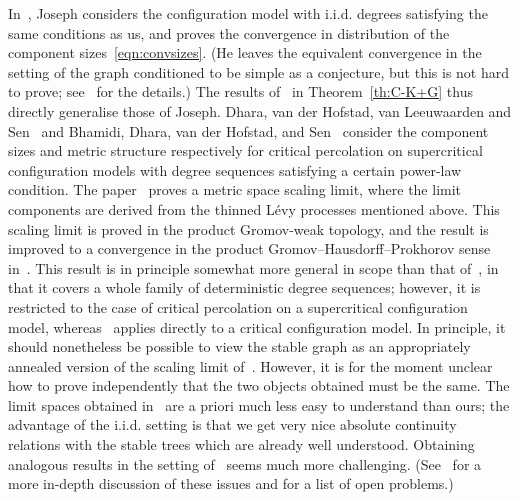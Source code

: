 \documentclass[10pt]{amsart}
\theoremstyle{definition}\newtheorem{defi}[theo]{Definition}\newtheorem{rema}[theo]{Remark}\newtheorem{exam}[theo]{Example}\newtheorem{exem}[theo]{Example}\newtheorem{nota}[theo]{Notation}
\begin{document}
In~\cite{Joseph14}, Joseph considers the configuration model with i.i.d. degrees satisfying the same conditions as us, and proves the convergence in distribution of the component sizes~\eqref{eqn:convsizes}. (He leaves the equivalent convergence in the setting of the graph conditioned to be simple as a conjecture, but this is not hard to prove; see~\cite{CKG17+} for the details.) The results of~\cite{CKG17+} in Theorem~\ref{th:C-K+G} thus directly generalise those of Joseph. Dhara, van der Hofstad, van Leeuwaarden and Sen~\cite{DvdHvLS16} and Bhamidi, Dhara, van der Hofstad, and Sen~\cite{BhDhvdHSen2020,BDvdHS17} consider the component sizes and metric structure respectively for critical percolation on supercritical configuration models with degree sequences satisfying a certain power-law condition. The paper~\cite{BDvdHS17} proves a metric space scaling limit, where the limit components are derived from the thinned Lévy processes mentioned above. This scaling limit is proved in the product Gromov-weak topology, and the result is improved to a convergence in the product Gromov--Hausdorff--Prokhorov sense in~\cite{BhDhvdHSen2020}. This result is in principle somewhat more general in scope than that of~\cite{CKG17+}, in that it covers a whole family of deterministic degree sequences; however, it is restricted to the case of critical percolation on a supercritical configuration model, whereas~\cite{CKG17+} applies directly to a critical configuration model. In principle, it should nonetheless be possible to view the stable graph as an appropriately annealed version of the scaling limit of~\cite{BDvdHS17}. However, it is for the moment unclear how to prove independently that the two objects obtained must be the same. The limit spaces obtained in~\cite{BDvdHS17} are a priori much less easy to understand than ours; the advantage of the i.i.d. setting is that we get very nice absolute continuity relations with the stable trees which are already well understood. Obtaining analogous results in the setting of~\cite{BDvdHS17} seems much more challenging. (See~\cite{CKG17+} for a more in-depth discussion of these issues and for a list of open problems.)
\end{document}
